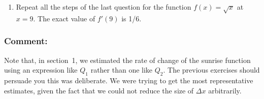 \begin{enumerate}
\begin{enumerate}
  \item How many digits of $Q_1$ stabilize in this table?  How many
digits of $Q_2$?

  \item Which is a better estimator---$Q_1$ or $Q_2$?  To indicate how much better, give the value of $h$ for which the {\em better\/} estimator provides an estimate that is as close as the best estimate provided by the {\em poorer\/} estimator.


\end{enumerate}
\item Repeat all the steps of the last question for the function $f(x) = \sqrt{x}$ at $x = 9$.  The exact value of $f'(9)$ is 1/6.




\end{enumerate}
\subsubsection{Comment:}
Note that, in section~1, we estimated the rate of
change of the sunrise function using an expression like $Q_1$ rather
than one like $Q_2$.  The previous exercises should persuade you this
was deliberate.  We were trying to get the most representative
estimates, given the fact that we could not reduce the size of $\Delta
x$ arbitrarily.


